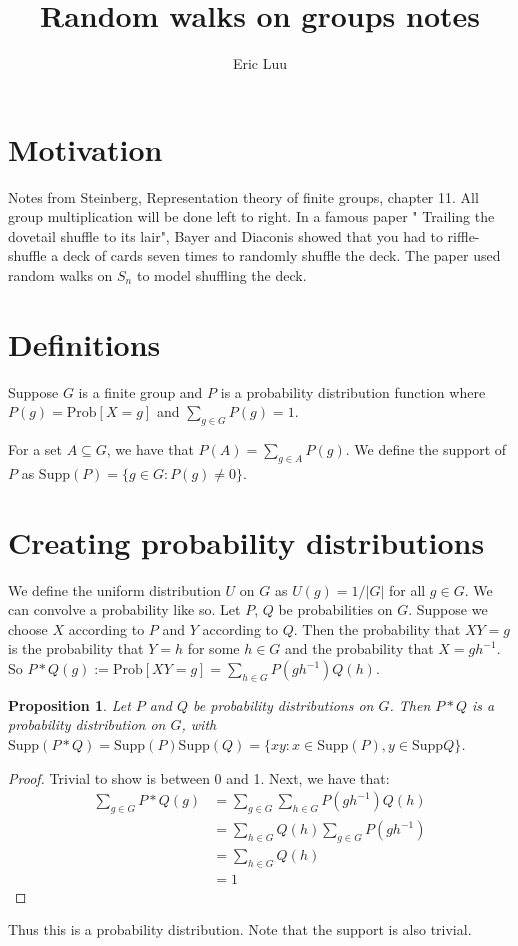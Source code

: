 \documentclass[]{article}
\title{Random walks on groups notes}
\author{Eric Luu}
\newtheorem{proposition}[theorem]{Proposition}
\theoremstyle{definition}
\numberwithin{theorem}{section}
\numberwithin{equation}{section}
\newcommand{\supp}{\text{Supp}}
\begin{document}
\maketitle
\section{Motivation}
Notes from Steinberg, Representation theory of finite groups, chapter 11. All group multiplication will be done left to right. 
In a famous paper " Trailing the dovetail shuffle to its lair", Bayer and Diaconis showed that you had to riffle-shuffle a deck of cards seven times to randomly shuffle the deck. The paper used random walks on $S_n$ to model shuffling the deck.

\section{Definitions}
Suppose $G$ is a finite group and $P$ is a probability distribution function where $P(g) = \text{Prob}[X = g]$ and $\sum_{g\in G} P(g) = 1$.

For a set $A \subseteq G$, we have that $P(A) = \sum_{g \in A} P(g)$. We define the support of $P$ as $\supp(P) = \lbrace g \in G : P(g) \neq 0 \rbrace$. 
\section{Creating probability distributions}
We define the uniform distribution $U$ on $G$ as $U(g) = 1/|G|$ for all $g \in G$. 
We can convolve a probability like so. Let $P$, $Q$ be probabilities on $G$. Suppose we choose $X$ according to $P$ and $Y$ according to $Q$. Then the probability that $XY = g$ is the probability that $Y = h$ for some $h \in G$ and the probability that $X = gh^{-1}$. 
So $P \ast Q(g) := \text{Prob}[XY = g] = \sum_{h\in G} P(gh^{-1})Q(h) $.

\begin{proposition}
	Let $P$ and $Q$ be probability distributions on $G$. Then $P \ast Q$ is a probability distribution on $G$, with $\supp(P \ast Q) = \supp(P)\supp(Q) = \lbrace xy : x \in \supp(P), y \in \supp Q \rbrace$. 
\end{proposition}
\begin{proof}
	Trivial to show is between 0 and 1.
	Next, we have that:
	\begin{align*}
		\sum_{g \in G} P \ast Q(g) &= \sum_{g \in G} \sum_{h \in G} P(gh^{-1}) Q(h)\\
		&=\sum_{h \in G} Q(h) \sum_{g \in G} P(gh^{-1})\\
		&= \sum_{h \in G} Q(h)\\
		&= 1
	\end{align*}
\end{proof}
Thus this is a probability distribution. Note that the support is also trivial.
\end{document}
